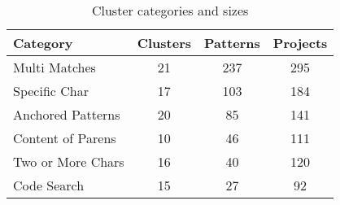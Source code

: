 \begin{table}
\begin{center}
\begin{small}

\caption{Cluster categories and sizes \label{tab:clustercats}}
\begin{tabular}{lccc}
\toprule
\textbf{Category} & \textbf{Clusters} & \textbf{Patterns} & \textbf{Projects} \\  \midrule \bigstrut
Multi Matches & 21 & 237 & 295\\
\midrule \bigstrut
Specific Char & 17 & 103 & 184\\
\midrule \bigstrut
Anchored Patterns & 20 & 85 & 141\\
\midrule \bigstrut
 Content of Parens & 10 & 46 & 111\\
\midrule \bigstrut
Two or More Chars & 16 & 40 & 120\\
\midrule \bigstrut
Code Search & 15 & 27 & 92 \\
\bottomrule
\end{tabular}
\vspace{-12pt}
\end{small}
\end{center}
\end{table}
